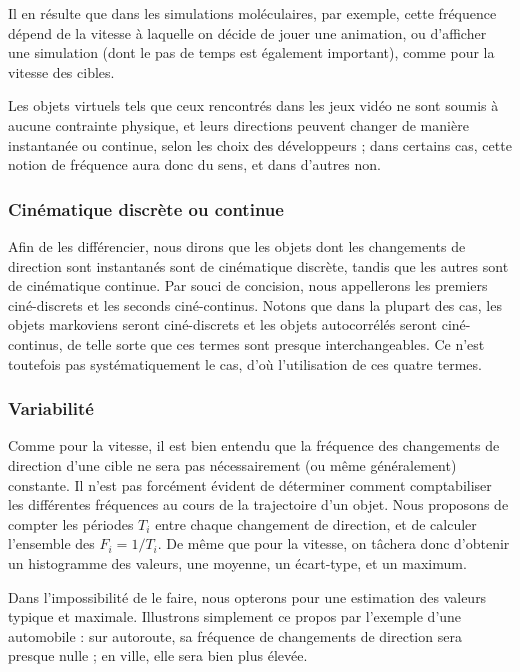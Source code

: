	Il en résulte que dans les simulations moléculaires, par exemple, cette fréquence dépend de la vitesse à laquelle on décide de jouer une animation, ou d'afficher une simulation (dont le pas de temps est également important), comme pour la vitesse des cibles.
	
	Les objets virtuels tels que ceux rencontrés dans les jeux vidéo ne sont soumis à aucune contrainte physique, et leurs directions peuvent changer de manière instantanée ou continue, selon les choix des développeurs ; dans certains cas, cette notion de fréquence aura donc du sens, et dans d'autres non.
	
	\FloatBarrier \subsubsection{Cinématique discrète ou continue}
	Afin de les différencier, nous dirons que les objets dont les changements de direction sont instantanés sont de cinématique discrète, tandis que les autres sont de cinématique continue. Par souci de concision, nous appellerons les premiers ciné-discrets et les seconds ciné-continus. Notons que dans la plupart des cas, les objets markoviens seront ciné-discrets et les objets autocorrélés seront ciné-continus, de telle sorte que ces termes sont presque interchangeables. Ce n'est toutefois pas systématiquement le cas, d'où l'utilisation de ces quatre termes.
	
	\FloatBarrier \subsubsection{Variabilité}
	Comme pour la vitesse, il est bien entendu que la fréquence des changements de direction d'une cible ne sera pas nécessairement (ou même généralement) constante. Il n'est pas forcément évident de déterminer comment comptabiliser les différentes fréquences au cours de la trajectoire d'un objet. Nous proposons de compter les périodes $T_{i}$ entre chaque changement de direction, et de calculer l'ensemble des $F_{i} = 1/T_{i}$. De même que pour la vitesse, on tâchera donc d'obtenir un histogramme des valeurs, une moyenne, un écart-type, et un maximum.
	
	Dans l'impossibilité de le faire, nous opterons pour une estimation des valeurs \og typique \fg{} et maximale. Illustrons simplement ce propos par l'exemple d'une automobile : sur autoroute, sa fréquence de changements de direction sera presque nulle ; en ville, elle sera bien plus élevée.
	
